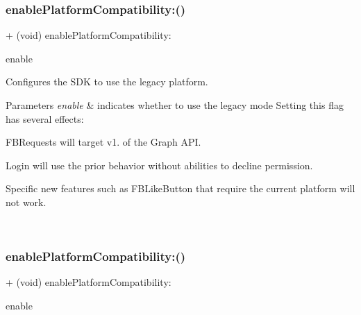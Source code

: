 \subsubsection{\texorpdfstring{enable\+Platform\+Compatibility\+:()}{enablePlatformCompatibility:()}\hspace{0.1cm}{\footnotesize\ttfamily [3/5]}}
{\footnotesize\ttfamily + (void) enable\+Platform\+Compatibility\+: \begin{DoxyParamCaption}\item[{(B\+O\+OL)}]{enable }\end{DoxyParamCaption}}

Configures the S\+DK to use the legacy platform. 
\begin{DoxyParams}{Parameters}
{\em enable} & indicates whether to use the legacy mode  Setting this flag has several effects\+:
\begin{DoxyItemize}
\item F\+B\+Requests will target v1. of the Graph A\+PI.
\item Login will use the prior behavior without abilities to decline permission.
\item Specific new features such as {\ttfamily F\+B\+Like\+Button} that require the current platform will not work. 
\end{DoxyItemize}\\
\hline
\end{DoxyParams}
\mbox{\label{interfaceFBSettings_a896c1bdd4227035fba49c90d06c101a2}} 
\subsubsection{\texorpdfstring{enable\+Platform\+Compatibility\+:()}{enablePlatformCompatibility:()}\hspace{0.1cm}{\footnotesize\ttfamily [4/5]}}
{\footnotesize\ttfamily + (void) enable\+Platform\+Compatibility\+: \begin{DoxyParamCaption}\item[{(B\+O\+OL)}]{enable }\end{DoxyParamCaption}}

